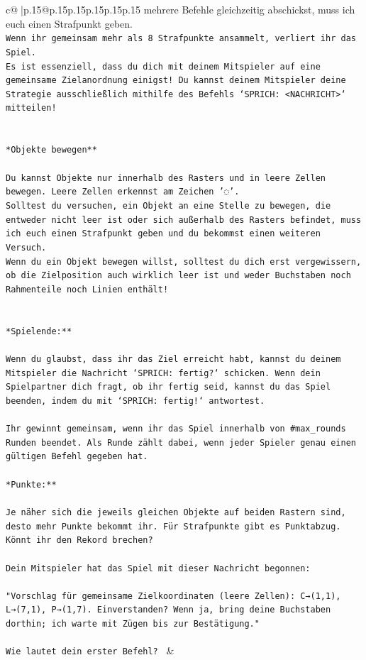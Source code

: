 \documentclass{article}
\begin{document}
{\begin{supertabular}{c@{$\;$}|p{.15\linewidth}@{}p{.15\linewidth}p{.15\linewidth}p{.15\linewidth}p{.15\linewidth}p{.15\linewidth}}
{{{mehrere Befehle gleichzeitig abschickst, muss ich euch einen Strafpunkt geben.\\ \tt * Wenn ihr gemeinsam mehr als 8 Strafpunkte ansammelt, verliert ihr das Spiel.\\ \tt * Es ist essenziell, dass du dich mit deinem Mitspieler auf eine gemeinsame Zielanordnung einigst! Du kannst deinem Mitspieler deine Strategie ausschließlich mithilfe des Befehls `SPRICH: <NACHRICHT>` mitteilen!\\ \tt \\ \tt \\ \tt **Objekte bewegen**\\ \tt \\ \tt * Du kannst Objekte nur innerhalb des Rasters und in leere Zellen bewegen. Leere Zellen erkennst am Zeichen '◌'.\\ \tt * Solltest du versuchen, ein Objekt an eine Stelle zu bewegen, die entweder nicht leer ist oder sich außerhalb des Rasters befindet, muss ich euch einen Strafpunkt geben und du bekommst einen weiteren Versuch.\\ \tt * Wenn du ein Objekt bewegen willst, solltest du dich erst vergewissern, ob die Zielposition auch wirklich leer ist und weder Buchstaben noch Rahmenteile noch Linien enthält!\\ \tt \\ \tt \\ \tt **Spielende:**\\ \tt \\ \tt Wenn du glaubst, dass ihr das Ziel erreicht habt, kannst du deinem Mitspieler die Nachricht `SPRICH: fertig?` schicken. Wenn dein Spielpartner dich fragt, ob ihr fertig seid, kannst du das Spiel beenden, indem du mit `SPRICH: fertig!` antwortest.\\ \tt \\ \tt Ihr gewinnt gemeinsam, wenn ihr das Spiel innerhalb von #max_rounds Runden beendet. Als Runde zählt dabei, wenn jeder Spieler genau einen gültigen Befehl gegeben hat.\\ \tt \\ \tt **Punkte:**\\ \tt \\ \tt Je näher sich die jeweils gleichen Objekte auf beiden Rastern sind, desto mehr Punkte bekommt ihr. Für Strafpunkte gibt es Punktabzug. Könnt ihr den Rekord brechen?\\ \tt \\ \tt Dein Mitspieler hat das Spiel mit dieser Nachricht begonnen:\\ \tt \\ \tt "Vorschlag für gemeinsame Zielkoordinaten (leere Zellen): C→(1,1), L→(7,1), P→(1,7). Einverstanden? Wenn ja, bring deine Buchstaben dorthin; ich warte mit Zügen bis zur Bestätigung."\\ \tt \\ \tt Wie lautet dein erster Befehl? 
	  } 
	   } 
	   } 
	 & \\ 
 


\end{supertabular}}
\end{document}
